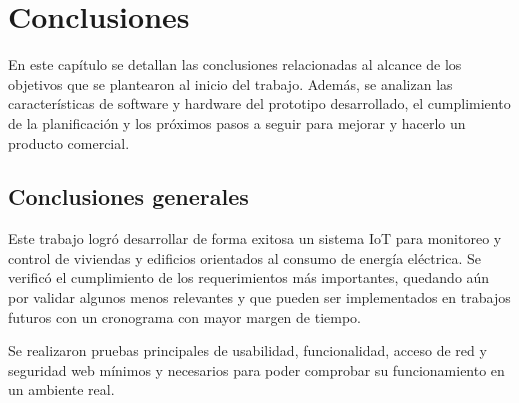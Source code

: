 
\chapter{Conclusiones} %

\label{Chapter5} %

En este capítulo se detallan las conclusiones relacionadas al alcance de los objetivos que se plantearon al inicio del trabajo. Además, se analizan las características de software y hardware del prototipo desarrollado, el cumplimiento de la planificación y los próximos pasos a seguir para mejorar y hacerlo un producto
comercial.



\section{Conclusiones generales }

Este trabajo logró desarrollar de forma exitosa un sistema IoT para monitoreo y control de viviendas y edificios orientados al consumo de energía eléctrica. Se verificó el cumplimiento de los requerimientos más importantes, quedando aún por validar algunos menos relevantes y que pueden ser implementados en trabajos futuros con un cronograma con mayor margen de tiempo.


Se realizaron pruebas principales de usabilidad, funcionalidad, acceso de red y seguridad web mínimos y necesarios para poder comprobar su funcionamiento en un ambiente real. 



